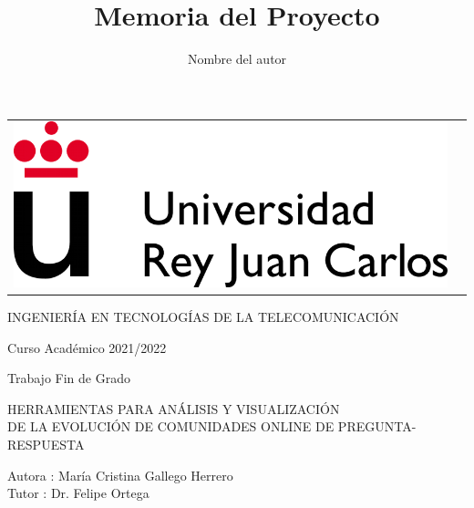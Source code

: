 \documentclass[a4paper, 12pt]{book}
\title{Memoria del Proyecto}
\author{Nombre del autor}
\begin{document}
 


\begin{titlepage}
\begin{center}
\begin{tabular}[c]{c c}
\includegraphics[scale=1.5]{img/LogoURJC.png}
\\
\end{tabular}

\vspace{3cm}

\Large 
INGENIERÍA EN TECNOLOGÍAS DE LA TELECOMUNICACIÓN 

\vspace{0.4cm}

\large
Curso Académico 2021/2022

\vspace{0.8cm}

Trabajo Fin de Grado

\vspace{2cm}

\LARGE HERRAMIENTAS PARA ANÁLISIS Y VISUALIZACIÓN \\
DE LA EVOLUCIÓN DE COMUNIDADES ONLINE DE PREGUNTA-RESPUESTA 
\vspace{3cm}

\large
Autora : María Cristina Gallego Herrero \\
Tutor : Dr. Felipe Ortega 
\end{center}
\end{titlepage}
\end{document}
